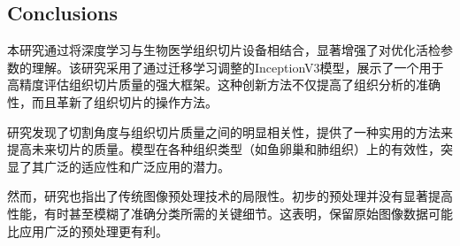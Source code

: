 \subsection{Conclusions}







本研究通过将深度学习与生物医学组织切片设备相结合，显著增强了对优化活检参数的理解。该研究采用了通过迁移学习调整的InceptionV3模型，展示了一个用于高精度评估组织切片质量的强大框架。这种创新方法不仅提高了组织分析的准确性，而且革新了组织切片的操作方法。

研究发现了切割角度与组织切片质量之间的明显相关性，提供了一种实用的方法来提高未来切片的质量。模型在各种组织类型（如鱼卵巢和肺组织）上的有效性，突显了其广泛的适应性和广泛应用的潜力。

然而，研究也指出了传统图像预处理技术的局限性。初步的预处理并没有显著提高性能，有时甚至模糊了准确分类所需的关键细节。这表明，保留原始图像数据可能比应用广泛的预处理更有利。

